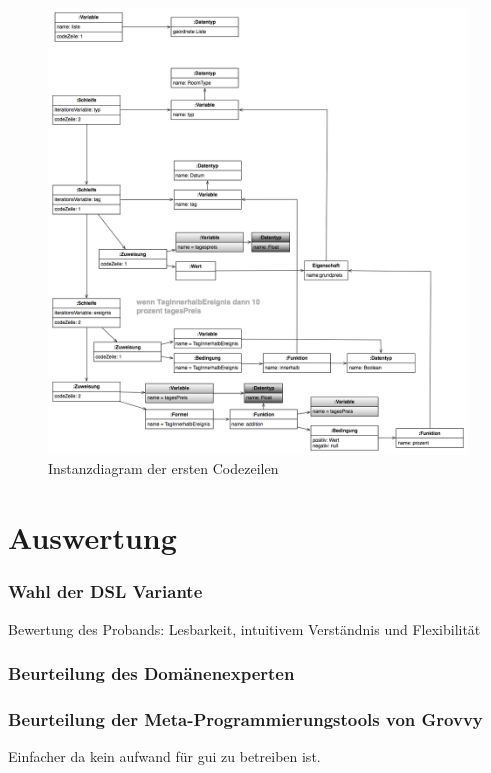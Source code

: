 \documentclass[11pt,english,ngerman, headsepline]{scrreprt}
\begin{document}
\begin{figure}[h!]
	\begin{center}
	\includegraphics[width=0.99\textwidth]{pics/mmInstanz}
	\end{center}
	\caption{Instanzdiagram der ersten Codezeilen}
	\label{mmInstanz.png}
\end{figure}
 
\chapter{Auswertung}
 
\subsection{Wahl der DSL Variante}
Bewertung des Probands: Lesbarkeit, intuitivem Verständnis und Flexibilität

\subsection{Beurteilung des Domänenexperten}

\subsection{Beurteilung der Meta-Programmierungstools von Grovvy} 
Einfacher da kein aufwand für gui zu betreiben ist.
 
\end{document}
